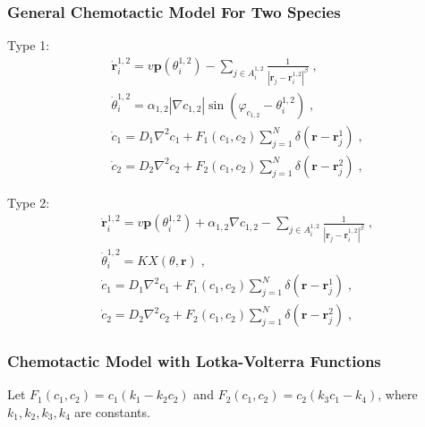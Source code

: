 \documentclass{article}
\begin{document}
\subsubsection{General Chemotactic Model For Two Species}
Type 1:
\begin{subequations}
    \begin{align}
        &\dot{\mathbf{r}}_{i}^{1,2}=v\mathbf{p}\left( \theta _{i}^{1,2} \right) -\sum_{j\in A_{i}^{1,2}}{\frac{1}{|\mathbf{r}_j-\mathbf{r}_{i}^{1,2}|^{\beta}}\;,}\\
        &\dot{\theta}_{i}^{1,2}=\alpha _{1,2}\left| \nabla c_{1,2} \right|\sin \left( \varphi _{c_{1,2}}-\theta _{i}^{1,2} \right) \;,\\
        &\dot{c}_1=D_1\nabla ^2c_1+F_1\left( c_1,c_2 \right) \sum_{j=1}^N{\delta \left( \mathbf{r}-\mathbf{r}_{j}^{1} \right) \;,}\\
        &\dot{c}_2=D_2\nabla ^2c_2+F_2\left( c_1,c_2 \right) \sum_{j=1}^N{\delta \left( \mathbf{r}-\mathbf{r}_{j}^{2} \right) \;,}
    \end{align}
\end{subequations}

\noindent Type 2:
\begin{subequations}
    \begin{align}
        &\dot{\mathbf{r}}_{i}^{1,2}=v\mathbf{p}\left( \theta _{i}^{1,2} \right) +\alpha _{1,2}\nabla c_{1,2}-\sum_{j\in A_{i}^{1,2}}{\frac{1}{|\mathbf{r}_j-\mathbf{r}_{i}^{1,2}|^{\beta}}\;,}\\
        &\dot{\theta}_{i}^{1,2}=KX\left( \theta ,\mathbf{r} \right) \;,\\
        &\dot{c}_1=D_1\nabla ^2c_1+F_1\left( c_1,c_2 \right) \sum_{j=1}^N{\delta \left( \mathbf{r}-\mathbf{r}_{j}^{1} \right) \;,}\\
        &\dot{c}_2=D_2\nabla ^2c_2+F_2\left( c_1,c_2 \right) \sum_{j=1}^N{\delta \left( \mathbf{r}-\mathbf{r}_{j}^{2} \right) \;,}
    \end{align}
\end{subequations}

\subsubsection{Chemotactic Model with Lotka-Volterra Functions}
Let $F_1\left( c_1,c_2 \right)=c_1\left( k_1-k_2c_2 \right)$ and $F_2\left( c_1,c_2 \right)=c_2\left( k_3c_1-k_4 \right)$, where $k_1,k_2,k_3,k_4$ are constants.
\end{document}
